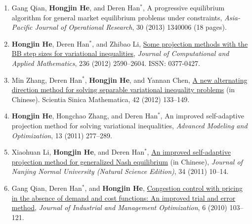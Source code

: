 \begin{enumerate}
\item Gang Qian, {\bf\color{black}Hongjin He}, and Deren Han$^*$, A progressive equilibrium algorithm for general market equilibrium problems under constraints, {\it Asia-Pacific Journal of Operational Research}, 30 (2013) 1340006 (18 pages).

\item {\bf\color{black}Hongjin He}, Deren Han$^*$, and Zhibao Li, \href{http://www.sciencedirect.com/science/article/pii/S0377042711006315}{\color{blue}Some projection methods with the BB step sizes for variational inequalities}, {\it Journal of Computational and Applied Mathematics}, {236} (2012) 2590--2604. ISSN: 0377-0427.

\item Min Zhang, Deren Han$^*$, {\bf\color{black}Hongjin He}, and Yannan Chen, \href{http://math.scichina.com:8081/sciA/CN/article/showArticleFile.do?attachType=PDF\&id=506468}{A new alternating direction method for solving separable variational inequality problems} (in Chinese). Scientia Sinica Mathematica, {42} (2012) 133--149.


\item {\bf\color{black}Hongjin He}, Hongchao Zhang, and Deren Han$^*$, {An improved self-adaptive projection method for solving variational inequalities}, {\it Advanced Modeling and Optimization}, {13} (2011) 277--289.


\item Xiaohuan Li, {\bf\color{black}Hongjin He}, and Deren Han$^*$, \href{http://d.wanfangdata.com.cn/Periodical\_njsdxbz201102002.aspx}{An improved self-adaptive projection method for generalized Nash equilibrium} (in Chinese), {\it Journal of Nanjing Normal University (Natural Science Edition)}, {34} (2011) 10--14.

\item Gang Qian, Deren Han$^*$, and {\bf\color{black}Hongjin He}, \href{http://www.aimsciences.org/journals/displayArticles.jsp?paperID=4728}{Congestion control with pricing in the absence of demand and cost functions: An improved trial and error method}, {\it Journal of Industrial and Management Optimization}, {6} (2010) 103--121.
	
\end{enumerate}

